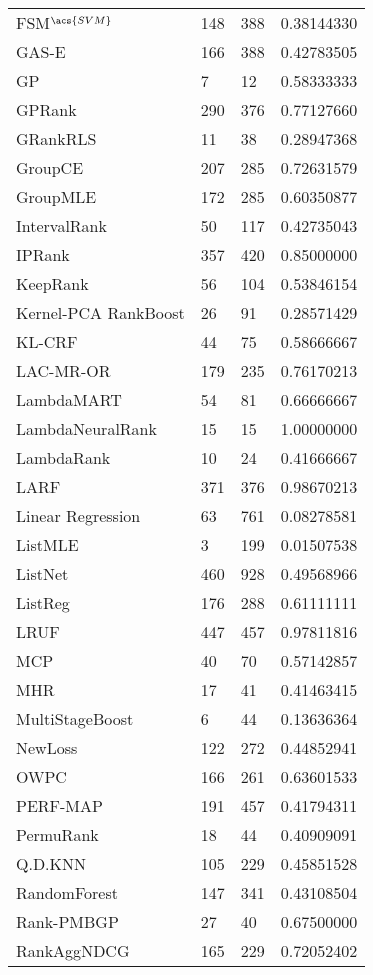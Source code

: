 \begin{longtable}{l|l|l|l}
FSM$^{\acs{SVM}}$ & 148 & 388 & 0.38144330 \\ 
GAS-E & 166 & 388 & 0.42783505 \\ 
\acs{GP} & 7 & 12 & 0.58333333 \\ 
\acs{GP}Rank & 290 & 376 & 0.77127660 \\ 
GRank\acs{RLS} & 11 & 38 & 0.28947368 \\ 
GroupCE & 207 & 285 & 0.72631579 \\ 
Group\acs{MLE} & 172 & 285 & 0.60350877 \\ 
IntervalRank & 50 & 117 & 0.42735043 \\ 
\acs{IP}Rank & 357 & 420 & 0.85000000 \\ 
KeepRank & 56 & 104 & 0.53846154 \\ 
Kernel-\acs{PCA} RankBoost & 26 &  91 & 0.28571429 \\ 
KL-\acs{CRF} &  44 & 75 & 0.58666667 \\ 
LAC-MR-OR & 179 & 235  & 0.76170213 \\ 
LambdaMART & 54 & 81 & 0.66666667 \\ 
LambdaNeuralRank & 15 & 15 & 1.00000000 \\ 
LambdaRank & 10 & 24 & 0.41666667 \\ 
LARF & 371 & 376 & 0.98670213 \\ 
Linear Regression & 63 & 761  & 0.08278581 \\ 
ListMLE & 3 & 199 & 0.01507538 \\ 
ListNet & 460 & 928 & 0.49568966 \\ 
ListReg & 176 & 288 & 0.61111111 \\ 
LRUF & 447 & 457 & 0.97811816 \\ 
MCP & 40 & 70 & 0.57142857 \\ 
MHR & 17 & 41 & 0.41463415 \\ 
MultiStageBoost & 6  & 44 & 0.13636364 \\ 
NewLoss & 122 & 272 & 0.44852941 \\ 
OWPC & 166 & 261 & 0.63601533 \\ 
PERF-\acs{MAP} & 191 & 457 & 0.41794311 \\ 
PermuRank & 18 & 44 & 0.40909091 \\ 
Q.D.\acs{KNN} & 105 & 229 & 0.45851528 \\ 
RandomForest & 147 & 341 & 0.43108504 \\ 
Rank-PMBGP & 27 & 40 & 0.67500000 \\ 
RankAgg\acs{NDCG} & 165 & 229 & 0.72052402 \\ 

\end{longtable}
